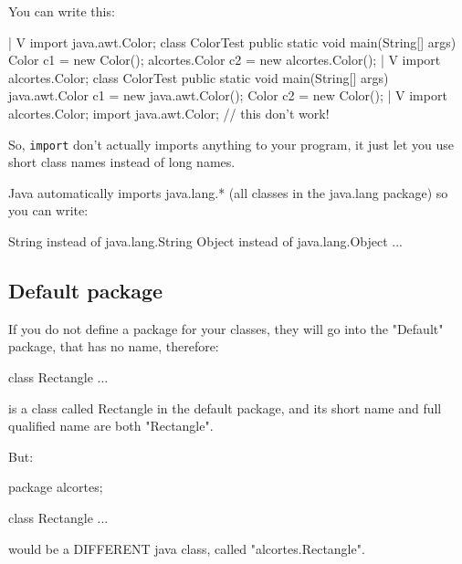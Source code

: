 \documentclass[a4paper, 9pt]{extarticle}
\begin{document}
You can write this:

\begin{blackboard}
              |
              V
import java.awt.Color;
class ColorTest {
    public static void main(String[] args) {
        Color c1 = new Color();
        alcortes.Color c2 = new alcortes.Color();
    }
}
              |
              V
import alcortes.Color;
class ColorTest {
    public static void main(String[] args) {
        java.awt.Color c1 = new java.awt.Color();
        Color c2 = new Color();
    }
}
              |
              V
import alcortes.Color;
import java.awt.Color;
// this don't work!
\end{blackboard}

So, \texttt{import} don't actually imports anything to your program, it just
let you use short class names instead of long names.

Java automatically imports java.lang.* (all classes in the java.lang package)
so you can write:

\begin{blackboard}
String instead of java.lang.String
Object instead of java.lang.Object
...
\end{blackboard}







\subsection{Default package}

If you do not define a package for your classes, they will go into the
"Default" package, that has no name, therefore:

\begin{blackboard}
class Rectangle {
  ...
}
\end{blackboard}

is a class called Rectangle in the default package, and its short name and full
qualified name are both "Rectangle".

But:

\begin{blackboard}
package alcortes;

class Rectangle {
...
}
\end{blackboard}

would be a DIFFERENT java class, called "alcortes.Rectangle".
\end{document}
